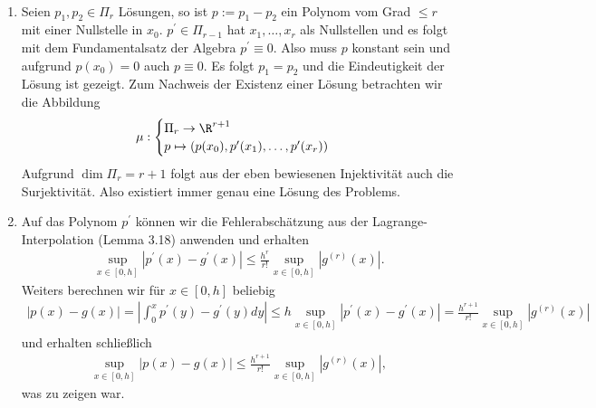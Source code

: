 \begin{solution}
\leavevmode \\
\begin{enumerate}[label = \textbf{\alph*)}]
  \item Seien $p_1,p_2 \in \Pi_r$ Lösungen, so ist $p := p_1 - p_2$ ein Polynom vom Grad $\leq r$
  mit einer Nullstelle in $x_0$.
  $p^{\prime} \in \Pi_{r-1}$ hat $x_1,\dots,x_r$ als Nullstellen und es folgt mit
  dem Fundamentalsatz der Algebra $p^{\prime} \equiv 0$. Also muss $p$ konstant
  sein und aufgrund $p(x_0) = 0$ auch $p \equiv 0$. Es folgt $p_1 = p_2$ und die
  Eindeutigkeit der Lösung ist gezeigt.
  Zum Nachweis der Existenz einer Lösung betrachten wir die Abbildung
  \begin{align*}
    \mu: \begin{cases}
      \Pi_r \rightarrow \R^{r+1} \\
      p \mapsto (p(x_0),p^{\prime}(x_1),\dots,p^{\prime}(x_r))
    \end{cases}
  \end{align*}
  Aufgrund $\dim \Pi_r = r + 1$ folgt aus der eben bewiesenen Injektivität auch
  die Surjektivität. Also existiert immer genau eine Lösung des Problems.
  \item Auf das Polynom $p^{\prime}$ können wir die Fehlerabschätzung aus der
  Lagrange-Interpolation (Lemma 3.18) anwenden und erhalten
  \begin{align*}
      \sup_{x \in [0,h]} |p^{\prime}(x) - g^{\prime}(x)| \leq \frac{h^{r}}{r!}\sup_{x \in [0,h]} |g^{(r)}(x)|.
  \end{align*}
  Weiters berechnen wir für $x \in [0,h]$ beliebig
  \begin{align*}
    |p(x) - g(x)| = \left|\int_0^x p^{\prime}(y) - g^{\prime}(y) dy \right| \leq h \sup_{x \in [0,h]} |p^{\prime}(x) - g^{\prime}(x)| =
    \frac{h^{r+1}}{r!}\sup_{x \in [0,h]} |g^{(r)}(x)|
  \end{align*}
  und erhalten schließlich
  \begin{align*}
  \sup_{x \in [0,h]} |p(x) - g(x)| \leq \frac{h^{r+1}}{r!}
  \sup_{x \in [0,h]}\left|g^{(r)}(x)\right|,
  \end{align*}
  was zu zeigen war.
\end{enumerate}

\end{solution}

